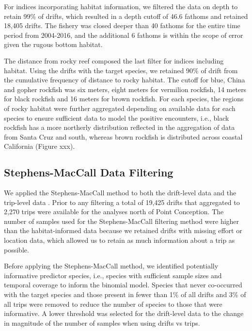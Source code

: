 \documentclass[
  authoryear,
  preprint,
  3p]{elsarticle}
\begin{document}
For indices incorporating habitat information, we filtered the data on
depth to retain 99\% of drifts, which resulted in a depth cutoff of 46.6
fathoms and retained 18,405 drifts. The fishery was closed deeper than
40 fathoms for the entire time period from 2004-2016, and the additional
6 fathoms is within the scope of error given the rugous bottom habitat.

The distance from rocky reef composed the last filter for indices
including habitat. Using the drifts with the target species, we retained
90\% of drift from the cumulative frequency of distance to rocky
habitat. The cutoff for blue, China and gopher rockfish was six meters,
eight meters for vermilion rockfish, 14 meters for black rockfish and 16
meters for brown rockfish. For each species, the regions of rocky
habitat were further aggregated depending on available data for each
species to ensure sufficient data to model the positive encounters,
i.e., black rockfish has a more northerly distribution reflected in the
aggregation of data from Santa Cruz and south, whereas brown rockfish is
distributed across coastal California (Figure xxx).

\hypertarget{stephens-maccall-data-filtering}{%
\subsection{Stephens-MacCall Data
Filtering}\label{stephens-maccall-data-filtering}}

We applied the Stephens-MacCall method to both the drift-level data and
the trip-level data \citeyearpar{Stephens:2004:MAS}. Prior to any
filtering a total of 19,425 drifts that aggregated to 2,270 trips were
available for the analyses north of Point Conception. The number of
samples used for the Stephens-MacCall filtering method were higher than
the habitat-informed data because we retained drifts with missing effort
or location data, which allowed us to retain as much information about a
trip as possible.

Before applying the Stephens-MacCall method, we identified potentially
informative predictor species, i.e., species with sufficient sample
sizes and temporal coverage to inform the binomial model. Species that
never co-occurred with the target species and those present in fewer
than 1\% of all drifts and 3\% of all trips were removed to reduce the
number of species to those that were informative. A lower threshold was
selected for the drift-level data to the change in magnitude of the
number of samples when using drifts vs trips.
\end{document}
